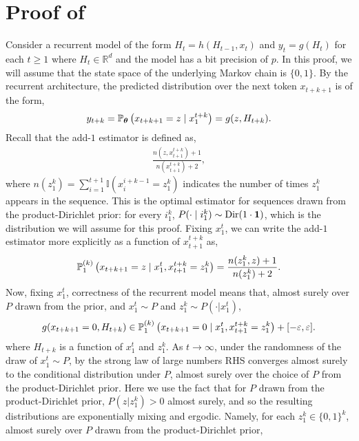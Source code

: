 \section{Proof of }
\label{app:lower-bound}
Consider a recurrent model of the form $H_t = h (H_{t-1},x_t)$ and $y_{t} = g(H_t)$ for each $t \ge 1$ where $H_t \in \mathbb{R}^d$ and the model has a bit precision of $p$. In this proof, we will assume that the state space of the underlying Markov chain is $\{0,1\}$. By the recurrent architecture, the predicted distribution over the next token $x_{t+k+1}$ is of the form,
\begin{equation}
y_{t+k} = \mathbb{P}_{\bm{\theta}}\left(x_{t+k+1} = z \mid x_1^{t+k}\right) = g(z, H_{t+k}).
\end{equation}
Recall that the add-$1$ estimator is defined as,
\begin{align}
    \frac{n(z,x_{t+1}^{t+k}) + 1}{n(x_{t+1}^{t+k}) + 2},
\end{align}
where $n(z_1^k) = \sum_{i=1}^{t+1} \mathbb{I} (x_{i}^{i+k-1} = z_1^k)$ indicates the number of times $z_1^k$ appears in the sequence. This is the optimal estimator for sequences drawn from the product-Dirichlet prior: for every $i_1^k$, $P(\cdot \mid i_1^k) \sim \mathrm{Dir}(1 \cdot \bm{1})$, which is the distribution we will assume for this proof. Fixing $x_1^t$, we can write the add-$1$ estimator more explicitly as a function of $x_{t+1}^{t+k}$ as,
\begin{align}
    \mathbb{P}_{1}^{(k)}\left(x_{t+k+1} = z \mid x_1^t, x_{t+1}^{t+k} = z_1^k\right) = \frac{n(z_1^k,z) + 1}{n(z_1^k) + 2}.
\end{align}
Now, fixing $x_1^t$, correctness of the recurrent model means that, almost surely over $P$ drawn from the prior, and $x_1^t \sim P$ and $z_1^k \sim P (\cdot | x_1^t)$,
\begin{align} \label{eq:44}
    g ( x_{t+k+1} = 0, H_{t+k} ) \in \mathbb{P}_{1}^{(k)}\left( x_{t+k+1} = 0 \mid x_1^t, x_{t+1}^{t+k} = z_1^k\right) + [-\varepsilon,\varepsilon].
\end{align}
where $H_{t+k}$ is a function of $x_1^t$ and $z_1^k$.
As $t \to \infty$, under the randomness of the draw of $x_1^t \sim P$, by the strong law of large numbers RHS converges almost surely to the conditional distribution under $P$, almost surely over the choice of $P$ from the product-Dirichlet prior. Here we use the fact that for $P$ drawn from the product-Dirichlet prior, $P(z|z_1^k) > 0$ almost surely, and so the resulting distributions are exponentially mixing and ergodic. Namely, for each $z_1^k \in \{0,1\}^k$, almost surely over $P$ drawn from the product-Dirichlet prior,
